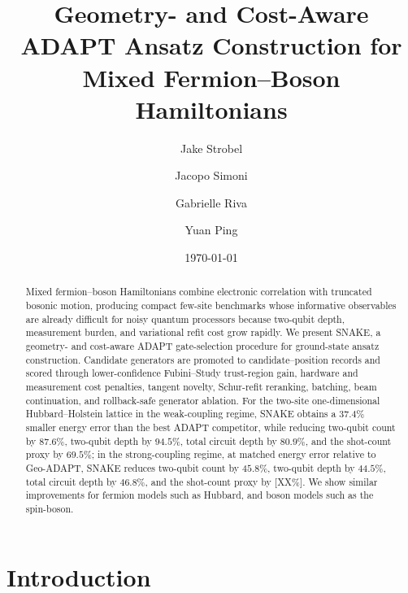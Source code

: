 \documentclass[
  reprint,
  amsmath,
  amssymb,
  aps,
  pra,
  nofootinbib,
  superscriptaddress,
  floatfix
]{revtex4-2}
\newcommand{\placeholder}[1]{\textcolor{red!70!black}{\ifmmode\left[#1\right]\else\textsf{[#1]}\fi}}
\begin{document}
\title{Geometry- and Cost-Aware ADAPT Ansatz Construction for Mixed Fermion--Boson Hamiltonians}

\author{Jake Strobel}
\author{Jacopo Simoni}
\author{Gabrielle Riva}
\author{Yuan Ping}

\date{\today}



\begin{abstract}
Mixed fermion--boson Hamiltonians combine electronic correlation with truncated bosonic motion, producing compact few-site benchmarks whose informative observables are already difficult for noisy quantum processors because two-qubit depth, measurement burden, and variational refit cost grow rapidly.  We present SNAKE, a geometry- and cost-aware ADAPT gate-selection procedure for ground-state ansatz construction.  Candidate generators are promoted to candidate--position records and scored through lower-confidence Fubini--Study trust-region gain, hardware and measurement cost penalties, tangent novelty, Schur-refit reranking, batching, beam continuation, and rollback-safe generator ablation.  For the two-site one-dimensional Hubbard--Holstein lattice in the weak-coupling regime, SNAKE obtains a \(37.4\%\) smaller energy error than the best ADAPT competitor, while reducing two-qubit count by \(87.6\%\), two-qubit depth by \(94.5\%\), total circuit depth by \(80.9\%\), and the shot-count proxy by \(69.5\%\); in the strong-coupling regime, at matched energy error relative to Geo-ADAPT, SNAKE reduces two-qubit count by \(45.8\%\), two-qubit depth by \(44.5\%\), total circuit depth by \(46.8\%\), and the shot-count proxy by \placeholder{XX\%}. We show similar improvements for fermion models such as Hubbard, and boson models such as the spin-boson.
\end{abstract}

\maketitle







\section{Introduction}
\end{document}
